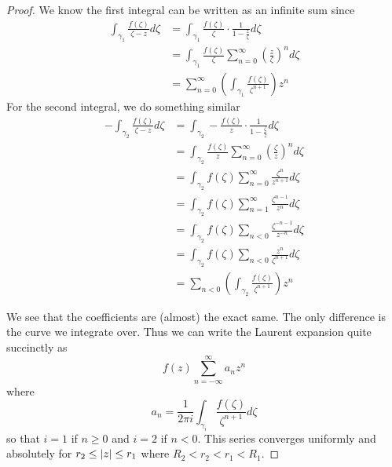 \begin{proof}
We know the first integral can be written as an infinite sum since 
\begin{align*}
    \int_{\gamma_1} \frac{f(\zeta)}{\zeta - z} d\zeta &= \int_{\gamma_1} \frac{f(\zeta)}{\zeta} \cdot \frac{1}{1 - \frac{z}{\zeta}} d\zeta\\
    &= \int_{\gamma_1} \frac{f(\zeta)}{\zeta} \sum_{n = 0}^\infty \left( \frac{z}{\zeta} \right)^n d\zeta\\
    &= \sum_{n = 0}^\infty \left( \int_{\gamma_1} \frac{f(\zeta)}{\zeta^{n + 1}} \right) z^n
\end{align*}
For the second integral, we do something similar
\begin{align*}
    -\int_{\gamma_2} \frac{f(\zeta)}{\zeta - z} d\zeta &= \int_{\gamma_2} -\frac{f(\zeta)}{z} \cdot \frac{1}{1 - \frac{\zeta}{z}} d\zeta\\
    &= \int_{\gamma_2} \frac{f(\zeta)}{z} \sum_{n = 0}^\infty \left(\frac{\zeta}{z}\right)^n d\zeta\\
    &= \int_{\gamma_2} f(\zeta) \sum_{n = 0}^\infty \frac{\zeta^n}{z^{n + 1}} d\zeta \\
    &= \int_{\gamma_2} f(\zeta) \sum_{n = 1}^\infty \frac{\zeta^{n - 1}}{z^n} d\zeta \\
    &= \int_{\gamma_2} f(\zeta) \sum_{n < 0} \frac{\zeta^{-n - 1}}{z^{-n}} d\zeta\\
    &= \int_{\gamma_2} f(\zeta) \sum_{n < 0} \frac{z^n}{\zeta^{n + 1}} d\zeta \\
    &= \sum_{n < 0} \left( \int_{\gamma_2} \frac{f(\zeta)}{\zeta^{n + 1}} \right) z^n 
\end{align*}

We see that the coefficients are (almost) the exact same. The only difference is the curve we integrate over. Thus we can write the Laurent expansion quite succinctly as 
$$ f(z) \sum_{n = -\infty}^{\infty} a_n z^n $$
where
$$ a_n = \frac{1}{2\pi i} \int_{\gamma_i} \frac{f(\zeta)}{\zeta^{n + 1}} d\zeta $$
so that $i = 1$ if $n \geq 0$ and $i = 2$ if $n < 0$.
This series converges uniformly and absolutely for $r_2 \leq \left|z\right| \leq r_1$ where $R_2 < r_2 < r_1 < R_1$. 
\end{proof}

